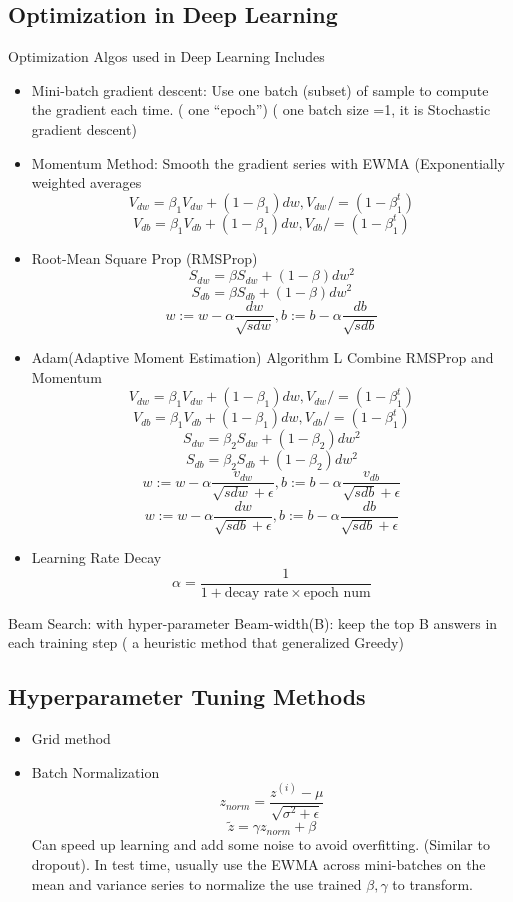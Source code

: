 \documentclass[11pt, openany]{book}              %
\begin{document}
\subsection{Optimization in Deep Learning}

Optimization Algos used in Deep Learning Includes

\begin{itemize}
	\item Mini-batch gradient descent: Use one batch (subset) of sample to compute the gradient each time. ( one “epoch”) ( one batch size =1, it is Stochastic gradient descent)
	\item Momentum Method: Smooth the gradient series with EWMA (Exponentially weighted averages 
	$$ V_{dw} = \beta_1V_{dw} + (1-\beta_1) dw, V_{dw} /= (1-\beta_1^t)$$
 	$$ V_{db} = \beta_1V_{db} + (1-\beta_1) dw,V_{db} /= (1-\beta_1^t)$$
 	\item Root-Mean Square Prop (RMSProp)
 	$$ S_{dw} = \beta S_{dw} + (1-\beta) dw^2 $$
 	$$ S_{db} = \beta S_{db} + (1-\beta) dw^2 $$
	$$ w:= w- \alpha \frac{dw}{\sqrt{sdw}}, b:= b- \alpha \frac{db}{\sqrt{sdb}}$$
	\item Adam(Adaptive Moment Estimation) Algorithm L Combine RMSProp and Momentum
	$$ V_{dw} = \beta_1V_{dw} + (1-\beta_1) dw, V_{dw} /= (1-\beta_1^t)$$
 	$$ V_{db} = \beta_1V_{db} + (1-\beta_1) dw,V_{db} /= (1-\beta_1^t)$$
 	$$ S_{dw} = \beta_2S_{dw} + (1-\beta_2) dw^2 $$
 	$$ S_{db} = \beta_2S_{db} + (1-\beta_2) dw^2 $$
	$$w:= w- \alpha \frac{v_{dw}}{\sqrt{sdw}+\epsilon}, b:= b- \alpha \frac{v_{db}}{\sqrt{sdb}+\epsilon}$$
	$$w:= w- \alpha \frac{dw}{\sqrt{sdb}+\epsilon}, b:= b- \alpha \frac{db}{\sqrt{sdb}+\epsilon}$$
	\item Learning Rate Decay
		$$ \alpha = \frac{1}{1+\text{decay rate} \times \text{epoch num}}$$	
\end{itemize}


Beam Search: with hyper-parameter Beam-width(B): keep the top B answers in each training step ( a heuristic method that generalized Greedy)

\subsection{Hyperparameter Tuning Methods}

\begin{itemize}
	\item Grid method 
	\item Batch Normalization 
	$$z_{norm} = \frac{z^{(i)}-\mu}{\sqrt{\sigma^2 + \epsilon}}$$
	$$\tilde{z} = \gamma z_{norm}  + \beta$$
	Can speed up learning and add some noise to avoid overfitting. (Similar to dropout).
	In test time, usually use the EWMA across mini-batches on the mean and variance series to normalize the use trained $\beta, \gamma$ to transform. 
\end{itemize}
\end{document}
